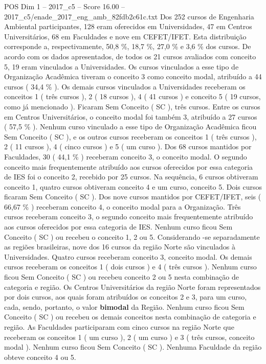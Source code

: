 \begin{textsample}{POS Dim 1 – 2017\_c5 – Score 16.00 – 2017\_c5/enade\_2017\_eng\_amb\_82fdb2c61c.txt}
Dos 252 cursos de Engenharia Ambiental participantes, 128 eram oferecidos em Universidades, 47 em Centros Universitários, 68 em Faculdades e nove em CEFET/IFET.
Esta distribuição corresponde a, respectivamente, 50,8 \%, 18,7 \%, 27,0 \% e 3,6 \% dos cursos.
De acordo com os dados apresentados, de todos os 21 cursos avaliados com conceito 5, 19 eram vinculados a Universidades.
Os cursos vinculados a esse tipo de Organização Acadêmica tiveram o conceito 3 como conceito modal, atribuído a 44 cursos ( 34,4 \% ).
Os demais cursos vinculados a Universidades receberam os conceitos 1 ( três cursos ), 2 ( 18 cursos ), 4 ( 41 cursos ) e conceito 5 ( 19 cursos, como já mencionado ).
Ficaram Sem Conceito ( SC ), três cursos.
Entre os cursos em Centros Universitários, o conceito modal foi também 3, atribuído a 27 cursos ( 57,5 \% ).
Nenhum curso vinculado a esse tipo de Organização Acadêmica ficou Sem Conceito ( SC ), e os outros cursos receberam os conceitos 1 ( três cursos ), 2 ( 11 cursos ), 4 ( cinco cursos ) e 5 ( um curso ).
Dos 68 cursos mantidos por Faculdades, 30 ( 44,1 \% ) receberam conceito 3, o conceito modal.
O segundo conceito mais frequentemente atribuído aos cursos oferecidos por essa categoria de IES foi o conceito 2, recebido por 25 cursos.
Na sequência, 6 cursos obtiveram conceito 1, quatro cursos obtiveram conceito 4 e um curso, conceito 5.
Dois cursos ficaram Sem Conceito ( SC ).
Dos nove cursos mantidos por CEFET/IFET, seis ( 66,67 \% ) receberam conceito 4, o conceito modal para a Organização.
Três cursos receberam conceito 3, o segundo conceito mais frequentemente atribuído aos cursos oferecidos por essa categoria de IES.
Nenhum curso ficou Sem Conceito ( SC ) ou recebeu o conceito 1, 2 ou 5.
Considerando -se separadamente as regiões brasileiras, nove dos 16 cursos da região Norte são vinculados à Universidades.
Quatro cursos receberam conceito 3, conceito modal.
Os demais cursos receberam os conceitos 1 ( dois cursos ) e 4 ( três cursos ).
Nenhum curso ficou Sem Conceito ( SC ) ou recebeu conceito 2 ou 5 nesta combinação de categoria e região.
Os Centros Universitários da região Norte foram representados por dois cursos, aos quais foram atribuídos os conceitos 2 e 3, para um curso, cada, sendo, portanto, o valor \textbf{bimodal} da Região.
Nenhum curso ficou Sem Conceito ( SC ) ou recebeu os demais conceitos nesta combinação de categoria e região.
As Faculdades participaram com cinco cursos na região Norte que receberam os conceitos 1 ( um curso ), 2 ( um curso ) e 3 ( três cursos, conceito modal ).
Nenhum curso ficou Sem Conceito ( SC ).
Nenhuma Faculdade da região obteve conceito 4 ou 5.

\end{textsample}
